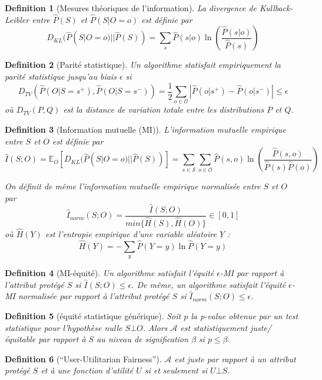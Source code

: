 \documentclass[draft]{article}
\newtheorem{myDef}{Definition}
\theoremstyle{definition}
\begin{document}
\begin{myDef}[Mesures théoriques de l'information]
  La divergence de Kullback-Leibler entre $\hat{P}(S)$ et $\hat{P}(S|O = o)$ est définie par
  \[
  D_{KL}(\hat{P}(S|O=o) || \hat{P}(S)) = \sum_{s} \hat{P}(s|o) \ln \left( \frac{\hat{P}(s|o)}{\hat{P}(s)} \right)
  \]
\end{myDef}

\begin{myDef}[Parité statistique]
  Un algorithme statisfait empiriquement la parité statistique jusqu'au biais $\epsilon$ si
  \[
  D_{TV}( \hat{P}(O|S=s^{+}), \hat{P}(O|S=s^{-})) = \frac{1}{2} \sum_{o \in \mathcal{O}} \left| \hat{P}(o|s^{+}) - \hat{P}(o|s^{-}) \right| \leq \epsilon
  \]
  où $D_{TV}(P,Q)$ est la distance de variation totale entre les distributions $P$ et $Q$.
\end{myDef}

\begin{myDef}[Information mutuelle (MI)]
  L'information mutuelle empirique entre $S$ et $O$ est définie par
  \[
  \hat{I}(S;O) = \mathbb{E}_{O} \left[ D_{KL}(\hat{P}(S|O=o) || \hat{P}(S)) \right] = \sum_{s \in \mathcal{S}} \sum_{o \in \mathcal{O}} \hat{P}(s,o) \ln \left( \frac{\hat{P}(s,o)}{\hat{P}(s) \hat{P}(o)} \right)
  \]

  On définit de même l'information mutuelle empirique normalisée entre $S$ et $O$ par
  \[
  \hat{I}_{norm}(S;O) = \frac{\hat{I}(S;O)}{min\{ \hat{H}(S), \hat{H}(O) \}} \in \left[ 0, 1 \right]
  \]
  où $\hat{H}(Y)$ est l'entropie empirique d'une variable aléatoire $Y$ : \[\hat{H}(Y) = - \sum_{y} \hat{P}(Y=y) \ln \hat{P}(Y=y)\]
\end{myDef}

\begin{myDef}[MI-équité]
  Un algorithme satisfait l'équité $\epsilon$-MI par rapport à l'attribut protégé $S$ si $\hat{I}(S;O) \leq \epsilon$.
  De même, un algorithme satisfait l'équité $\epsilon$-MI normalisée par rapport à l'attribut protégé $S$ si $\hat{I}_{norm}(S;O) \leq \epsilon$.
\end{myDef}

\begin{myDef}[équité statistique générique]
  Soit $p$ la p-value obtenue par un test statistique pour l'hypothèse nulle $S \bot O$. Alors $\mathcal{A}$ est statistiquement juste\slash équitable par rapport à $S$ au niveau de signification $\beta$ si $p \leq \beta$.
\end{myDef}

\begin{myDef}[``User-Utilitarian Fairness'']
  $\mathcal{A}$ est juste par rapport à un attribut protégé $S$ et à une fonction d'utilité $U$ si et seulement si $U \bot S$.
\end{myDef}
\end{document}

